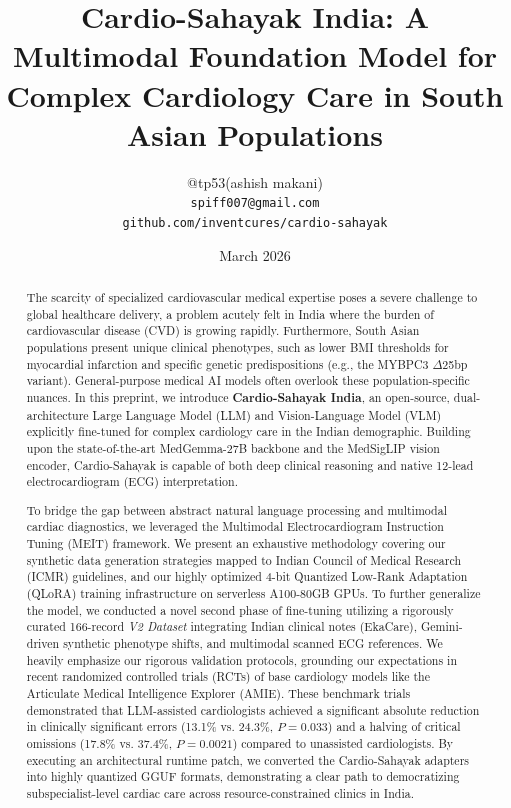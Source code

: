 \documentclass[11pt,a4paper]{article}
\title{\textbf{Cardio-Sahayak India: A Multimodal Foundation Model for Complex Cardiology Care in South Asian Populations}}
\author{
@tp53(ashish makani) \\
\texttt{spiff007@gmail.com} \\
\texttt{github.com/inventcures/cardio-sahayak}
}
\date{March 2026}
\begin{document}

\maketitle

\begin{abstract}
The scarcity of specialized cardiovascular medical expertise poses a severe challenge to global healthcare delivery, a problem acutely felt in India where the burden of cardiovascular disease (CVD) is growing rapidly. Furthermore, South Asian populations present unique clinical phenotypes, such as lower BMI thresholds for myocardial infarction and specific genetic predispositions (e.g., the MYBPC3 $\Delta$25bp variant). General-purpose medical AI models often overlook these population-specific nuances. In this preprint, we introduce \textbf{Cardio-Sahayak India}, an open-source, dual-architecture Large Language Model (LLM) and Vision-Language Model (VLM) explicitly fine-tuned for complex cardiology care in the Indian demographic. Building upon the state-of-the-art MedGemma-27B backbone and the MedSigLIP vision encoder, Cardio-Sahayak is capable of both deep clinical reasoning and native 12-lead electrocardiogram (ECG) interpretation. 

To bridge the gap between abstract natural language processing and multimodal cardiac diagnostics, we leveraged the Multimodal Electrocardiogram Instruction Tuning (MEIT) framework. We present an exhaustive methodology covering our synthetic data generation strategies mapped to Indian Council of Medical Research (ICMR) guidelines, and our highly optimized 4-bit Quantized Low-Rank Adaptation (QLoRA) training infrastructure on serverless A100-80GB GPUs. To further generalize the model, we conducted a novel second phase of fine-tuning utilizing a rigorously curated 166-record \textit{V2 Dataset} integrating Indian clinical notes (EkaCare), Gemini-driven synthetic phenotype shifts, and multimodal scanned ECG references. We heavily emphasize our rigorous validation protocols, grounding our expectations in recent randomized controlled trials (RCTs) of base cardiology models like the Articulate Medical Intelligence Explorer (AMIE). These benchmark trials demonstrated that LLM-assisted cardiologists achieved a significant absolute reduction in clinically significant errors (13.1\% vs. 24.3\%, $P=0.033$) and a halving of critical omissions (17.8\% vs. 37.4\%, $P=0.0021$) compared to unassisted cardiologists. By executing an architectural runtime patch, we converted the Cardio-Sahayak adapters into highly quantized GGUF formats, demonstrating a clear path to democratizing subspecialist-level cardiac care across resource-constrained clinics in India. 
\end{abstract}
\end{document}
